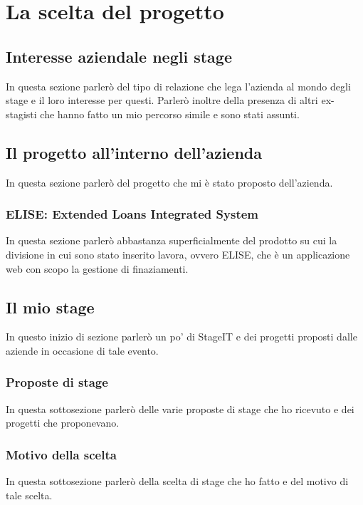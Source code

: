 

\chapter{La scelta del progetto}

\section{Interesse aziendale negli stage}
In questa sezione parlerò del tipo di relazione che lega l'azienda al mondo degli stage e il loro interesse per questi. Parlerò inoltre della presenza di altri ex-stagisti che hanno fatto un mio percorso simile e sono stati assunti.

\section{Il progetto all'interno dell'azienda}
In questa sezione parlerò del progetto che mi è stato proposto dell'azienda.

\subsection{ELISE: Extended Loans Integrated System}
In questa sezione parlerò abbastanza superficialmente del prodotto su cui la divisione in cui sono stato inserito lavora, ovvero ELISE, che è un applicazione web con scopo la gestione di finaziamenti.
		
\section{Il mio stage}
In questo inizio di sezione parlerò un po' di StageIT e dei progetti proposti dalle aziende in occasione di tale evento.

\subsection{Proposte di stage}
In questa sottosezione parlerò delle varie proposte di stage che ho ricevuto e dei progetti che proponevano.

\subsection{Motivo della scelta}
In questa sottosezione parlerò della scelta di stage che ho fatto e del motivo di tale scelta.

